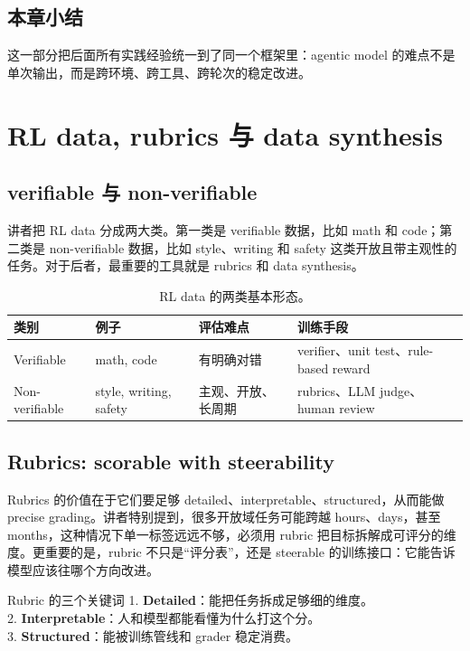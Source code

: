 \documentclass[a4paper]{article}
\begin{document}
\subsection{本章小结}
这一部分把后面所有实践经验统一到了同一个框架里：agentic model 的难点不是单次输出，而是跨环境、跨工具、跨轮次的稳定改进。

\section{RL data, rubrics 与 data synthesis}
\subsection{verifiable 与 non-verifiable}
讲者把 RL data 分成两大类。第一类是 verifiable 数据，比如 math 和 code；第二类是 non-verifiable 数据，比如 style、writing 和 safety 这类开放且带主观性的任务。对于后者，最重要的工具就是 rubrics 和 data synthesis。

\begin{table}[H]
\centering
\small
\begin{tabular}{@{}p{}p{}p{}p{}@{}}
\toprule
类别 & 例子 & 评估难点 & 训练手段 \\
\midrule
Verifiable & math, code & 有明确对错 & verifier、unit test、rule-based reward \\
Non-verifiable & style, writing, safety & 主观、开放、长周期 & rubrics、LLM judge、human review \\
\bottomrule
\end{tabular}
\caption{RL data 的两类基本形态。}
\end{table}

\subsection{Rubrics: scorable with steerability}
Rubrics 的价值在于它们要足够 detailed、interpretable、structured，从而能做 precise grading。讲者特别提到，很多开放域任务可能跨越 hours、days，甚至 months，这种情况下单一标签远远不够，必须用 rubric 把目标拆解成可评分的维度。更重要的是，rubric 不只是“评分表”，还是 steerable 的训练接口：它能告诉模型应该往哪个方向改进。

\begin{importantbox}{Rubric 的三个关键词}
1. \textbf{Detailed}：能把任务拆成足够细的维度。\\
2. \textbf{Interpretable}：人和模型都能看懂为什么打这个分。\\
3. \textbf{Structured}：能被训练管线和 grader 稳定消费。
\end{importantbox}
\end{document}
